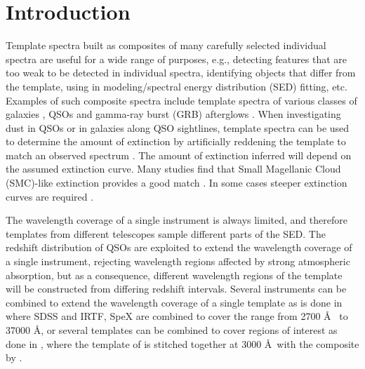 \documentclass{aa}    %
\newcommand{\sectlabel}[1]{\label{sect:#1}}
\begin{document}


\maketitle
%


\section{Introduction}     \sectlabel{introduction}
Template spectra built as composites of many carefully selected
individual spectra are useful for a wide range of purposes, e.g., detecting features that are too weak to be detected in individual
spectra, identifying objects that differ from the template, using
in modeling/spectral energy distribution (SED) fitting, etc. Examples of such composite spectra
include template spectra of various classes of galaxies
\citep{Mannucci2001, Shapley2003, Dobos2012}, QSOs
\citep{CristianiS.andVio1990, Boyle1990, Francis1991, Zheng1997,
  Brotherton2000, VandenBerk2001, Telfer2002, Richards2006a,
  Glikman2006, Lusso2015} and gamma-ray burst (GRB) afterglows \citep{Christensen2011}.
When investigating dust in QSOs or in galaxies along QSO sightlines, template spectra can be used to determine the amount of
extinction by artificially reddening the template to match an observed
spectrum
\citep[e.g.,][]{Glikman2007,Urrutia2009,Wang2012,Fynbo2013,Krogager2015}.
The amount of extinction inferred will depend on the assumed
extinction curve. Many studies find that Small Magellanic Cloud (SMC)-like extinction provides
a good match \citep{Richards2003,Hopkins2004}. In some cases steeper
extinction curves are required
\citep{Fynbo2013,Jiang2013,Leighly2014}.

The wavelength coverage of a single instrument is always limited, and
therefore templates from different telescopes sample different parts
of the SED. The redshift distribution of QSOs
are exploited to extend the wavelength coverage of a single instrument,
rejecting wavelength regions affected by strong atmospheric
absorption, but as a consequence, different wavelength regions of the
template will be constructed from differing redshift
intervals. Several instruments can be combined to extend the
wavelength coverage of a single template as is done in
\citet{Glikman2006} where SDSS \citep{Gunn2006} and IRTF, SpeX
\citep{Rayner2003} are combined to cover the range from 2700 \AA~ to
37000 \AA, or several templates can be combined to cover regions of
interest as done in \citet{Zhou2010}, where the template of
\citet{VandenBerk2001} is stitched together at 3000 \AA~with the
composite by \citet{Glikman2006}. 
\end{document}

